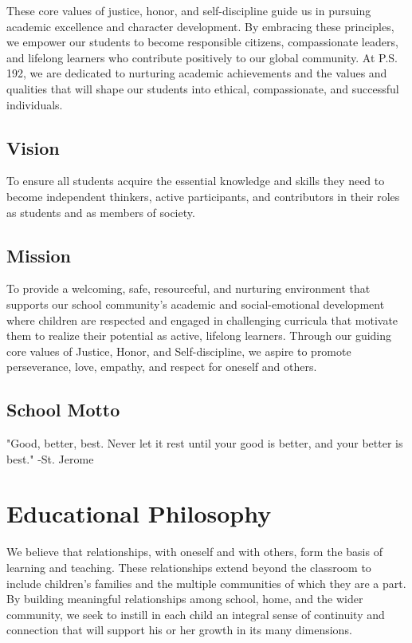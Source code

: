 \documentclass[letterpaper, 11pt]{article}
\begin{document}
These core values of justice, honor, and self-discipline guide us in pursuing academic excellence and character development. By embracing these principles, we empower our students to become responsible citizens, compassionate leaders, and lifelong learners who contribute positively to our global community. At P.S. 192, we are dedicated to nurturing academic achievements and the values and qualities that will shape our students into ethical, compassionate, and successful individuals.

\subsection{Vision}
\label{sec:org2fc1499}
To ensure all students acquire the essential knowledge and skills they need to become independent thinkers, active participants, and contributors in their roles as students and as members of society.

\subsection{Mission}
\label{sec:orgdb32096}
To provide a welcoming, safe, resourceful, and nurturing environment that supports our school community's academic and social-emotional development where children are respected and engaged in challenging curricula that motivate them to realize their potential as active, lifelong learners. Through our guiding core values of Justice, Honor, and Self-discipline, we aspire to promote perseverance, love, empathy, and respect for oneself and others.

\subsection{School Motto}
\label{sec:orgb08f74b}
"Good, better, best. Never let it rest until your good is better, and your better is best."  -St. Jerome

\section{Educational Philosophy}
\label{sec:org5247ab8}
We believe that relationships, with oneself and with others, form the basis of learning and teaching. These relationships extend beyond the classroom to include children’s families and the multiple communities of which they are a part. By building meaningful relationships among school, home, and the wider community, we seek to instill in each child an integral sense of continuity and connection that will support his or her growth in its many dimensions.
\end{document}

